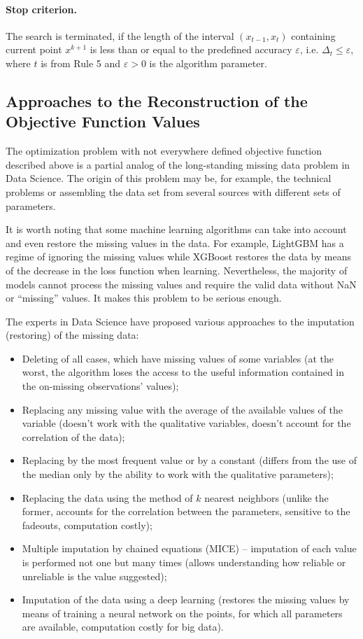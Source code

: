 \documentclass[runningheads]{llncs}
\begin{document}
\paragraph{Stop criterion.} The search is terminated, if the length of the interval $(x_{t-1},x_t)$ containing current point $x^{k+1}$ is less than or equal to the predefined accuracy $\varepsilon$, i.e. $\Delta _t \leq \varepsilon$, where $t$ is from Rule 5 and $\varepsilon>0$ is the algorithm parameter.

\subsection{ Approaches to the Reconstruction of the Objective Function Values }

The optimization problem with not everywhere defined objective function described above is a partial analog of the long-standing missing data problem in Data Science. The origin of this problem may be, for example, the technical problems or assembling the data set from several sources with different sets of parameters.

It is worth noting that some machine learning algorithms can take into account and even restore the missing values in the data. For example, LightGBM has a regime of ignoring the missing values while XGBoost restores the data by means of the decrease in the loss function when learning. Nevertheless, the majority of models cannot process the missing values and require the valid data without NaN or ``missing'' values. It makes this problem to be serious enough.

The experts in Data Science have proposed various approaches to the imputation (restoring) of the missing data:
\begin{itemize}
  \item Deleting of all cases, which have missing values of some variables (at the worst, the algorithm loses the access to the useful information contained in the on-missing observations’ values);
  \item Replacing any missing value with the average of the available values of the variable (doesn’t work with the qualitative variables, doesn’t account for the correlation of the data);
  \item Replacing by the most frequent value or by a constant (differs from the use of the median only by the ability to work with the qualitative parameters);
  \item Replacing the data using the method of $k$ nearest neighbors (unlike the former, accounts for the correlation between the parameters, sensitive to the fadeouts, computation costly);
  \item Multiple imputation by chained equations (MICE) -- imputation of each value is performed not one but many times (allows understanding how reliable or unreliable is the value suggested);
  \item Imputation of the data using a deep learning (restores the missing values by means of training a neural network on the points, for which all parameters are available, computation costly for big data).
\end{itemize}
\end{document}
